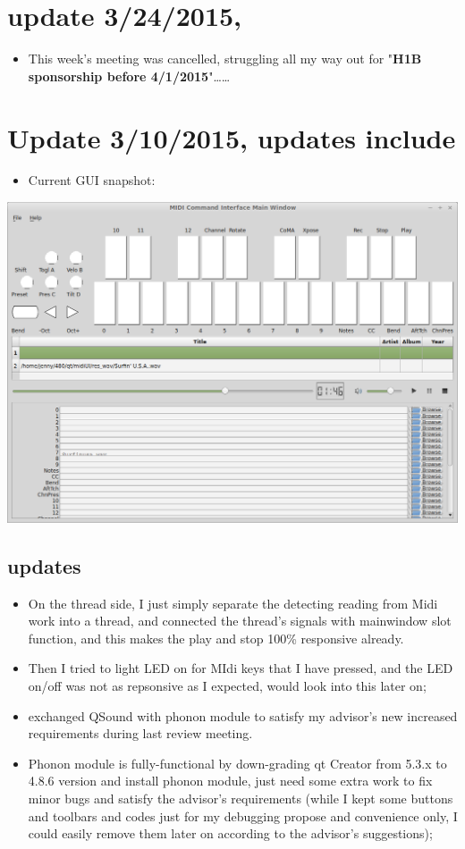 \documentclass[9pt,b5paper]{article}
\begin{document}
\section{update 3/24/2015,}
\label{sec-2}
\begin{itemize}
\item This week's meeting was cancelled, struggling all my way out for "\textbf{H1B sponsorship before 4/1/2015}"\ldots{}\ldots{}
\end{itemize}
\section{Update 3/10/2015, updates include}
\label{sec-3}
\begin{itemize}
\item Current GUI snapshot:
\end{itemize}

\includegraphics[width=.9\linewidth]{./pic/Screenshot_from_2015-03-08_13:31:00.png}
\subsection{updates}
\label{sec-3-1}
\begin{itemize}
\item On the thread side, I just simply separate the detecting reading from Midi work into a thread, and connected the thread's signals with mainwindow slot function, and this makes the play and stop 100\% responsive already.
\item Then I tried to light LED on for MIdi keys that I have pressed, and the LED on/off was not as repsonsive as I expected, would look into this later on;
\item exchanged QSound with phonon module to satisfy my advisor's new increased requirements during last review meeting.
\item Phonon module is fully-functional by down-grading qt Creator from 5.3.x to 4.8.6 version and install phonon module, just need some extra work to fix minor bugs and satisfy the advisor's requirements (while I kept some buttons and toolbars and codes just for my debugging propose and convenience only, I could easily remove them later on according to the advisor's suggestions);
\end{itemize}
\end{document}
